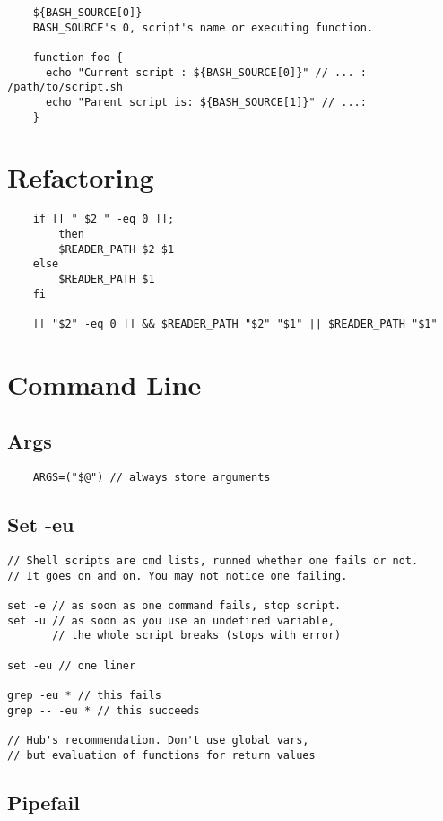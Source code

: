 \begin{verbatim}
    ${BASH_SOURCE[0]}
    BASH_SOURCE's 0, script's name or executing function.

    function foo {
      echo "Current script : ${BASH_SOURCE[0]}" // ... : /path/to/script.sh
      echo "Parent script is: ${BASH_SOURCE[1]}" // ...: 
    }
\end{verbatim}
\section{Refactoring}
\begin{verbatim}
    if [[ " $2 " -eq 0 ]];
        then
        $READER_PATH $2 $1
    else
        $READER_PATH $1
    fi

    [[ "$2" -eq 0 ]] && $READER_PATH "$2" "$1" || $READER_PATH "$1"
\end{verbatim}

\section{Command Line}
\subsection{Args}

\begin{verbatim}
    ARGS=("$@") // always store arguments
\end{verbatim}

\subsection{Set -eu}

\begin{verbatim}
// Shell scripts are cmd lists, runned whether one fails or not.
// It goes on and on. You may not notice one failing. 

set -e // as soon as one command fails, stop script. 
set -u // as soon as you use an undefined variable, 
       // the whole script breaks (stops with error)

set -eu // one liner

grep -eu * // this fails
grep -- -eu * // this succeeds

// Hub's recommendation. Don't use global vars, 
// but evaluation of functions for return values
\end{verbatim}

\subsection{Pipefail}

